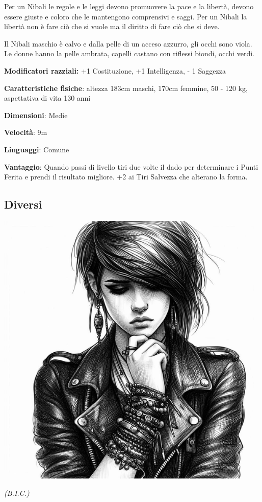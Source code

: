 \begin{multicols}{2}
Per un Nibali le regole e le leggi devono promuovere la pace e la libertà, devono essere giuste e coloro che le mantengono comprensivi e saggi. Per un Nibali la libertà non è fare ciò che si vuole ma il diritto di fare ciò che si deve.

Il Nibali maschio è calvo e dalla pelle di un acceso azzurro, gli occhi sono viola. Le donne hanno la pelle ambrata, capelli castano con riflessi biondi, occhi verdi.

\textbf{Modificatori razziali:} +1 Costituzione, +1 Intelligenza, - 1 Saggezza

\textbf{Caratteristiche fisiche}: altezza 183cm maschi, 170cm femmine, 50 - 120 kg, aspettativa di vita 130 anni

\textbf{Dimensioni}: Medie

\textbf{Velocità}: 9m

\textbf{Linguaggi}: Comune

\textbf{Vantaggio}: Quando passi di livello tiri due volte il dado per determinare i Punti Ferita e prendi il risultato migliore. +2 ai Tiri Salvezza che alterano la forma.


\subsection{Diversi}\label{diverso}\hypertarget{diverso}{}


\begin{center}
\includegraphics[width=0.7\linewidth]{immagini/diverso2-ai.png}

\textit{(B.I.C.)}
\end{center}


\end{multicols}
